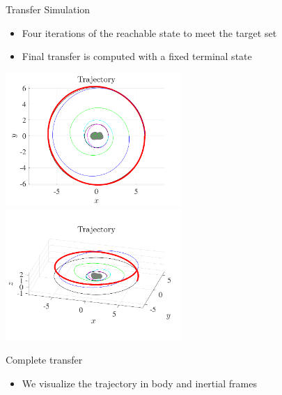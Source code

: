 \begin{frame}{Transfer Simulation}
    \begin{itemize}
        \item Four iterations of the reachable state to meet the target set
        \item Final transfer is computed with a fixed terminal state
    \end{itemize}

    \begin{center}
        \includegraphics[width=0.5\textwidth,height=0.7\textheight,keepaspectratio]{figures/2016AAS/trajectory.pdf}~
        \includegraphics[width=0.5\textwidth,height=0.7\textheight,keepaspectratio]{figures/2016AAS/trajectory_3d.pdf}
    \end{center}

\end{frame}

\begin{frame}{Complete transfer}
\begin{itemize}
    \item We visualize the trajectory in body and inertial frames
\end{itemize}

\begin{center}
  ~\hfill
\end{center}

\end{frame}

